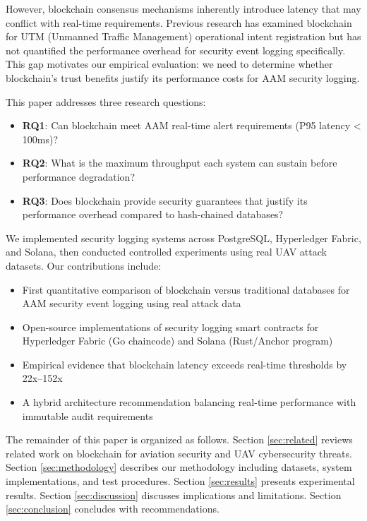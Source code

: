 \documentclass[conference]{IEEEtran}
\begin{document}
However, blockchain consensus mechanisms inherently introduce latency that may conflict with real-time requirements. Previous research has examined blockchain for UTM (Unmanned Traffic Management) operational intent registration \cite{permissioned2024} but has not quantified the performance overhead for security event logging specifically. This gap motivates our empirical evaluation: we need to determine whether blockchain's trust benefits justify its performance costs for AAM security logging.

This paper addresses three research questions:

\begin{itemize}
\item \textbf{RQ1}: Can blockchain meet AAM real-time alert requirements (P95 latency < 100ms)?
\item \textbf{RQ2}: What is the maximum throughput each system can sustain before performance degradation?
\item \textbf{RQ3}: Does blockchain provide security guarantees that justify its performance overhead compared to hash-chained databases?
\end{itemize}

We implemented security logging systems across PostgreSQL, Hyperledger Fabric, and Solana, then conducted controlled experiments using real UAV attack datasets. Our contributions include:

\begin{itemize}
\item First quantitative comparison of blockchain versus traditional databases for AAM security event logging using real attack data
\item Open-source implementations of security logging smart contracts for Hyperledger Fabric (Go chaincode) and Solana (Rust/Anchor program)
\item Empirical evidence that blockchain latency exceeds real-time thresholds by 22x--152x
\item A hybrid architecture recommendation balancing real-time performance with immutable audit requirements
\end{itemize}

The remainder of this paper is organized as follows. Section \ref{sec:related} reviews related work on blockchain for aviation security and UAV cybersecurity threats. Section \ref{sec:methodology} describes our methodology including datasets, system implementations, and test procedures. Section \ref{sec:results} presents experimental results. Section \ref{sec:discussion} discusses implications and limitations. Section \ref{sec:conclusion} concludes with recommendations.
\end{document}
